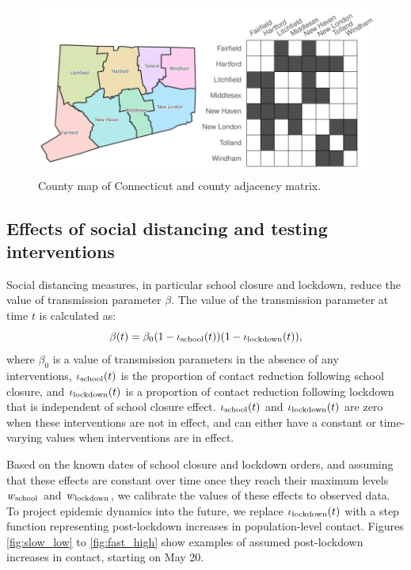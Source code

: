 \documentclass[11pt]{article}
\begin{document}
\begin{figure} %
	\centering
	\includegraphics[width=.7\textwidth]{figures/map_adj.pdf}
	\caption{County map of Connecticut and county adjacency matrix.}
	\label{fig:map}
\end{figure}




\subsection{Effects of social distancing and testing interventions} 

Social distancing measures, in particular school closure and lockdown, reduce the value of transmission parameter $\beta$. The value of the transmission parameter at time $t$ is calculated as:
\[ \beta(t) = \beta_0 (1 - \iota\textsubscript{school}(t) ) (1 - \iota\textsubscript{lockdown} (t) ), \]
where $\beta_0$ is a value of transmission parameters in the absence of any interventions, $\iota\textsubscript{school}(t)$ is the proportion of contact reduction following school closure, and $\iota\textsubscript{lockdown} (t)$ is a proportion of contact reduction following lockdown that is independent of school closure effect. $\iota\textsubscript{school}(t)$ and $\iota\textsubscript{lockdown} (t)$ are zero when these interventions are not in effect, and can either have a constant or time-varying values when interventions are in effect. 

Based on the known dates of school closure and lockdown orders, and assuming that these effects are constant over time once they reach their maximum levels $w\textsubscript{school}$ and $w\textsubscript{lockdown}$, we calibrate the values of these effects to observed data. To project epidemic dynamics into the future, we replace  $\iota\textsubscript{lockdown} (t)$ with a step function representing post-lockdown increases in population-level contact.  Figures \ref{fig:slow_low} to \ref{fig:fast_high} show examples of assumed post-lockdown increases in contact, starting on May 20. 
\end{document}
